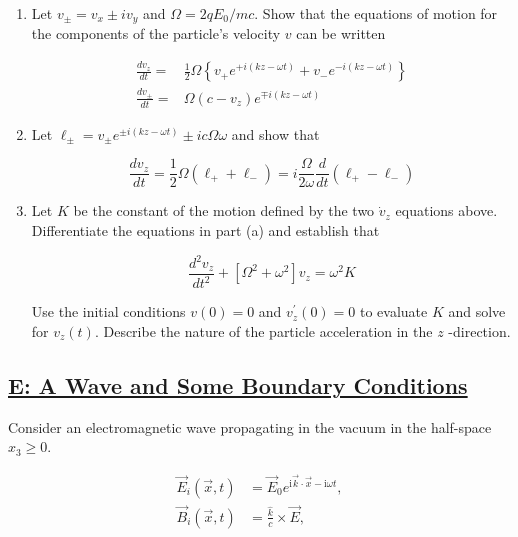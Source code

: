 \begin{enumerate}
	\item Let $v_{\pm}=v_{x} \pm i v_{y}$ and $\Omega=2 q E_{0} / m c .$ Show that the equations of motion for the components of the particle's velocity $v$ can be written
	
	\begin{subequations}
		\begin{align}
			\frac{d v_{z}}{d t}=&\frac{1}{2} \Omega\left\{v_{+} e^{+i(k z-\omega t)}+v_{-} e^{-i(k z-\omega t)}\right\} \\
			\frac{d v_{\pm}}{d t}=&\Omega\left(c-v_{z}\right) e^{\mp i(k z-\omega t)}
		\end{align}
	\end{subequations}

	\item Let $\ell_{\pm}=v_{\pm} e^{\pm i(k z-\omega t)} \pm i c \Omega \omega$ and show that

	\begin{equation}
		\frac{d v_{z}}{d t}=\frac{1}{2} \Omega\left(\ell_{+}+\ell_{-}\right)=i \frac{\Omega}{2 \omega} \frac{d}{d t}\left(\ell_{+}-\ell_{-}\right)
	\end{equation}
	
	\item Let $K$ be the constant of the motion defined by the two $\dot{v}_{z}$ equations above. Differentiate the equations in part (a) and establish that

	\begin{equation}
		\frac{d^{2} v_{z}}{d t^{2}}+\left[\Omega^{2}+\omega^{2}\right] v_{z}=\omega^{2} K
	\end{equation}

	Use the initial conditions $v(0)=0$ and $v_{z}^{\prime}(0)=0$ to evaluate $K$ and solve for $v_{z}(t) .$ Describe the nature of the particle acceleration in the $z$ -direction.
\end{enumerate}

\subsection{\hyperref[E: A Wave and Some Boundary Conditions]{E: A Wave and Some Boundary Conditions}}

Consider an electromagnetic wave propagating in the vacuum in the half-space $x_{3} \geq 0$.

\begin{subequations}
	\begin{align}
		\vec{E}_{i}(\vec{x}, t)&=\vec{E}_{0} e^{\mathrm{i} \vec{k} \cdot \vec{x}-\mathrm{i} \omega t} ,\\
		\vec{B}_{i}(\vec{x}, t)&=\frac{\hat{k}}{c} \times \vec{E},
	\end{align}
\end{subequations}

